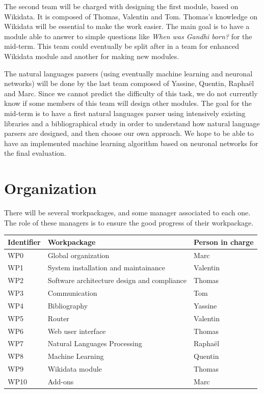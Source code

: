 \documentclass[a4paper,10pt]{article}
\begin{document}
The second team will be charged with designing the first module, based on Wikidata. It is
composed of Thomas, Valentin and Tom. Thomas's knowledge on Wikidata will be essential
to make the work easier. The main goal is to have a module able to answer to simple questions
like \textit{When was Gandhi born?} for the mid-term. This team could eventually be
split after in a team for enhanced Wikidata module and another for making new modules.

The natural languages parsers (using eventually machine learning and neuronal networks) 
will be done by the last team composed of Yassine, Quentin, Raphaël and Marc. 
Since we cannot predict the difficulty of this task, we do not currently know if 
some members of this team will design other modules.
The goal for the mid-term is to have a first natural languages parser using intensively
existing libraries and a bibliographical study in order to understand how natural 
language parsers are designed, and then choose our own approach. We hope to be able 
to have an implemented machine learning algorithm based on neuronal networks for 
the final evaluation.

\section{Organization}

There will be several workpackages, and some manager associated to each one.
The role of these managers is to ensure the good progress of their workpackage.

\begin{center}
	\begin{tabular}{lll}
		Identifier & Workpackage & Person in charge \\ \hline
		WP0 & Global organization & Marc\\
		WP1 & System installation and maintainance & Valentin\\
		WP2 & Software architecture design and compliance & Thomas\\
		WP3 & Communication & Tom\\
		WP4 & Bibliography & Yassine\\
		WP5 & Router & Valentin\\
		WP6 & Web user interface & Thomas\\
		WP7 & Natural Languages Processing & Raphaël\\
		WP8 & Machine Learning & Quentin\\
		WP9 & Wikidata module & Thomas\\
		WP10 & Add-ons & Marc\\
	\end{tabular}
\end{center}
\end{document}
